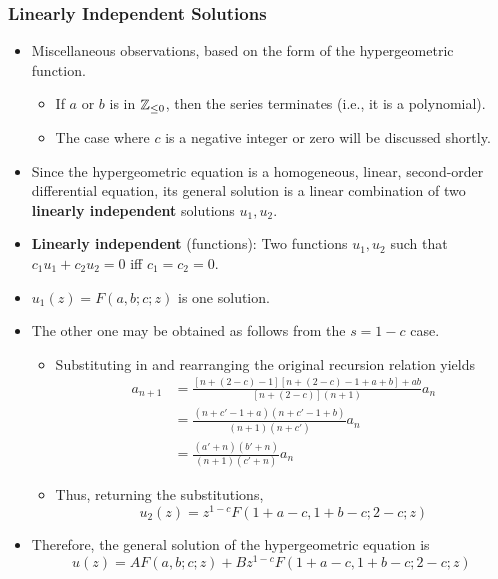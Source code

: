 \documentclass[../finalProject.tex]{subfiles}
\begin{document}
\subsubsection{Linearly Independent Solutions}
\begin{itemize}
    \item Miscellaneous observations, based on the form of the hypergeometric function.
    \begin{itemize}
        \item If $a$ or $b$ is in $\mathbb{Z}_{\leq 0}$, then the series terminates (i.e., it is a polynomial).
        \item The case where $c$ is a negative integer or zero will be discussed shortly.
    \end{itemize}
    \item Since the hypergeometric equation is a homogeneous, linear, second-order differential equation, its general solution is a linear combination of two \textbf{linearly independent} solutions $u_1,u_2$.
    \item \textbf{Linearly independent} (functions): Two functions $u_1,u_2$ such that $c_1u_1+c_2u_2=0$ iff $c_1=c_2=0$.
    \item $u_1(z)=F(a,b;c;z)$ is one solution.
    \item The other one may be obtained as follows from the $s=1-c$ case.
    \begin{itemize}
        \item Substituting in and rearranging the original recursion relation yields
        \begin{align*}
            a_{n+1} &= \frac{[n+(2-c)-1][n+(2-c)-1+a+b]+ab}{[n+(2-c)](n+1)}a_n\\
            &= \frac{(n+c'-1+a)(n+c'-1+b)}{(n+1)(n+c')}a_n\\
            &= \frac{(a'+n)(b'+n)}{(n+1)(c'+n)}a_n
        \end{align*}
        \item Thus, returning the substitutions,
        \begin{equation*}
            u_2(z) = z^{1-c}F(1+a-c,1+b-c;2-c;z)
        \end{equation*}
    \end{itemize}
    \item Therefore, the general solution of the hypergeometric equation is
    \begin{equation*}
        u(z) = AF(a,b;c;z)+Bz^{1-c}F(1+a-c,1+b-c;2-c;z)
    \end{equation*}
\end{itemize}
\end{document}
